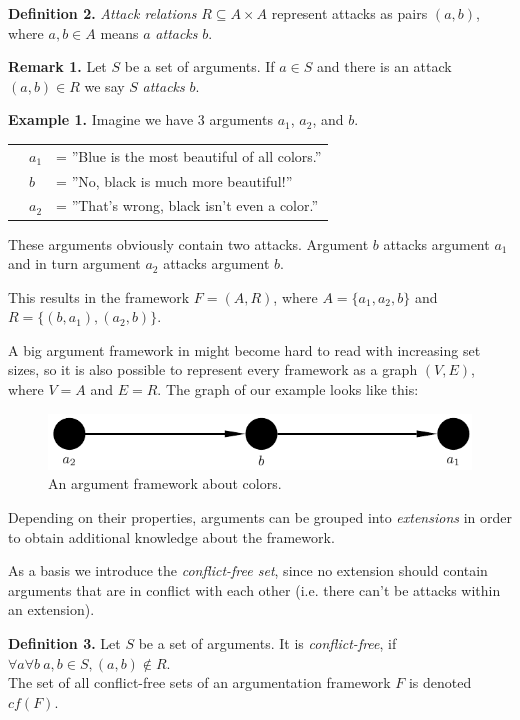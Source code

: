 \documentclass[draft,final]{vutinfth} %
\newcommand{\hl}{\par\vspace{6pt}} %
\newcommand{\cl}{\par\vspace{12pt}} %
\newcommand{\dl}{\par\vspace{24pt}} %
\begin{document}
\textbf{Definition 2.} \emph{Attack relations} $R\subseteq A\times A$ represent attacks as pairs $(a,b)$, where $a,b\in A$ means $a$ \emph{attacks} $b$.\cl

\textbf{Remark 1.} Let $S$ be a set of arguments. If $a\in S$ and there is an attack $(a,b)\in R$ we say $S$ \emph{attacks} $b$.\cl

\textbf{Example 1.} Imagine we have 3 arguments $a_1$, $a_2$, and $b$.\hl
			\begin{tabular}{p{0.5cm}p{0.5cm}l}
			& $a_1$ & = ''Blue is the most beautiful of all colors.''\\
			& $b$ & = ''No, black is much more beautiful!''\\
			& $a_2$ & = ''That's wrong, black isn't even a color.''
			\end{tabular}\hl
These arguments obviously contain two attacks. Argument $b$ attacks argument $a_1$ and in turn argument $a_2$ attacks argument $b$.\hl
This results in the framework $F=(A,R)$, where $A=\{a_1,a_2,b\}$ and $R=\{(b,a_1),(a_2,b)\}$.\cl

A big argument framework in might become hard to read with increasing set sizes, so it is also possible to represent every framework as a graph $(V,E)$, where $V=A$ and $E=R$. The graph of our example looks like this:

\FloatBarrier
	\begin{figure}[!htb]
		\centering
		\includegraphics[width=\linewidth]{graphs/ex1.pdf}
		\caption{An argument framework about colors.}
	\end{figure}
\FloatBarrier

Depending on their properties, arguments can be grouped into \emph{extensions} in order to obtain additional knowledge about the framework.\dl

As a basis we introduce the \emph{conflict-free set}, since no extension should contain arguments that are in conflict with each other (i.e. there can't be attacks within an extension).\cl

\textbf{Definition 3.} Let $S$ be a set of arguments. It is \emph{conflict-free}, if $\forall a \forall b\ a,b\in S, (a,b)\notin R$.\\
The set of all conflict-free sets of an argumentation framework $F$ is denoted $cf(F)$.\cl
\end{document}
